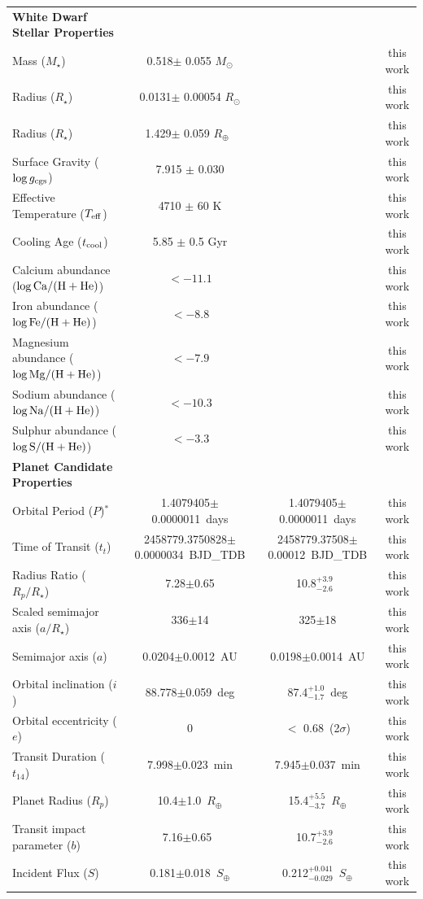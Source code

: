 \documentclass{nature3}
\newcommand{\rsun}{\ensuremath{R_\odot}}
\newcommand{\msun}{\ensuremath{M_\odot}}
\newcommand{\rearth}{\ensuremath{R_\oplus}}
\newcommand{\rprstb}{7.28}
\newcommand{\urprstb}{\ensuremath{\pm}0.65}
\newcommand{\tdurb}{7.998}
\newcommand{\utdurb}{\ensuremath{\pm}0.023}
\newcommand{\arstb}{336}
\newcommand{\uarstb}{\ensuremath{\pm}14}
\newcommand{\inclb}{88.778}
\newcommand{\uinclb}{\ensuremath{\pm}0.059}
\newcommand{\impb}{7.16}
\newcommand{\uimpb}{\ensuremath{\pm}0.65}
\newcommand{\rplb}{10.4}
\newcommand{\urplb}{\ensuremath{\pm}1.0}
\newcommand{\perplb}{1.4079405}
\newcommand{\uperplb}{\ensuremath{\pm}0.0000011}
\newcommand{\ttransitb}{2458779.3750828}
\newcommand{\uttransitb}{\ensuremath{\pm}0.0000034}
\newcommand{\ab}{0.0204}
\newcommand{\uab}{\ensuremath{\pm}0.0012}
\newcommand{\fluxb}{0.181}
\newcommand{\ufluxb}{\ensuremath{\pm}0.018}
\newcommand{\rprstbecc}{10.8}
\newcommand{\urprstbecc}{\ensuremath{^{+3.9}_{-2.6}}}
\newcommand{\tdurbecc}{7.945}
\newcommand{\utdurbecc}{\ensuremath{\pm}0.037}
\newcommand{\arstbecc}{325}
\newcommand{\uarstbecc}{\ensuremath{\pm}18}
\newcommand{\inclbecc}{87.4}
\newcommand{\uinclbecc}{\ensuremath{^{+1.0}_{-1.7}}}
\newcommand{\impbecc}{10.7}
\newcommand{\uimpbecc}{\ensuremath{^{+3.9}_{-2.6}}}
\newcommand{\rplbecc}{15.4}
\newcommand{\urplbecc}{\ensuremath{^{+5.5}_{-3.7}}}
\newcommand{\perplbecc}{1.4079405}
\newcommand{\uperplbecc}{\ensuremath{\pm}0.0000011}
\newcommand{\ttransitbecc}{2458779.37508}
\newcommand{\uttransitbecc}{\ensuremath{\pm}0.00012}
\newcommand{\abecc}{0.0198}
\newcommand{\uabecc}{\ensuremath{\pm}0.0014}
\newcommand{\fluxbecc}{0.212}
\newcommand{\ufluxbecc}{\ensuremath{^{+0.041}_{-0.029}}}
\newcommand{\eccb}{ \ensuremath{<} 0.68}
\begin{document}
\begin{table}
\begin{threeparttable}
\begin{tabular}{lccc}
\textbf{White Dwarf Stellar Properties} & & &  \\
Mass ($M_\star$) & 0.518$\pm$ 0.055 \msun& & this work\\
Radius ($R_\star$) & 0.0131$\pm$ 0.00054 \rsun&  & this work\\
Radius ($R_\star$) & 1.429$\pm$ 0.059 \rearth\ &  & this work\\
Surface Gravity ($\log{g_{\rm cgs}}$)& 7.915 $\pm$ 0.030& & this work\\
Effective Temperature ($T_{\rm eff}$)& 4710 $\pm$ 60 K& & this work\\
Cooling Age ($t_{\rm cool}$)& 5.85 $\pm$ 0.5 Gyr& & this work\\
Calcium abundance ($\log{\rm Ca/(H+He)}$)& $< -11.1$& & this work\\
Iron abundance ($\log{\rm Fe/(H+He)}$)& $< -8.8$& & this work\\
Magnesium abundance ($\log{\rm Mg/(H+He)}$)& $< -7.9$& & this work\\
Sodium abundance ($\log{\rm Na/(H+He)}$)& $< -10.3$& & this work\\
Sulphur abundance ($\log{\rm S/(H+He)}$)& $< -3.3$& & this work\\
\textbf{Planet Candidate Properties} & & &  \\
Orbital Period ($P$)$^{*}$ &\perplb\uperplb\ days& \perplbecc\uperplbecc\ days& this work\\
Time of Transit ($t_{t}$) &\ttransitb\uttransitb\  BJD\_TDB& \ttransitbecc\uttransitbecc\ BJD\_TDB& this work\\
Radius Ratio ($R_p/R_\star$) & \rprstb\urprstb  &  \rprstbecc\urprstbecc\ & this work\\
Scaled semimajor axis ($a/R_\star$)  &\arstb\uarstb  & \arstbecc\uarstbecc & this work\\
Semimajor axis ($a$)  &\ab\uab\ AU  & \abecc\uabecc\ AU & this work\\
Orbital inclination ($i$) &\inclb\uinclb\  deg& \inclbecc\uinclbecc\ deg& this work\\
Orbital eccentricity ($e$) & 0 &\eccb\ (2$\sigma$) & this work\\
Transit Duration ($t_{14}$) &\tdurb\utdurb\ min& \tdurbecc\utdurbecc\ min& this work\\
Planet Radius ($R_p$) &\rplb\urplb\ \rearth&\rplbecc\urplbecc\ \rearth& this work\\
Transit impact parameter ($b$) &\impb\uimpb\  & \impbecc\uimpbecc\ & this work\\
Incident Flux ($S$) &\fluxb\ufluxb\ $S_\oplus$ &\fluxbecc\ufluxbecc\ $S_\oplus$& this work\\

\end{tabular}
\end{threeparttable}
\end{table}
\end{document}
